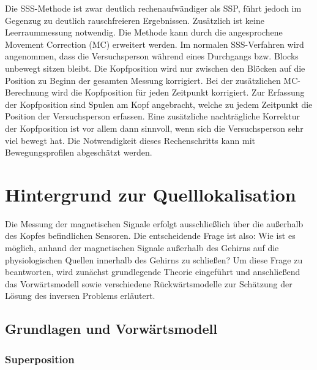\documentclass[doc,a4paper,12pt]{apa6}
\begin{document}
Die SSS-Methode ist zwar deutlich rechenaufwändiger als SSP, führt jedoch im Gegenzug zu deutlich rauschfreieren Ergebnissen. Zusätzlich ist keine Leerraummessung notwendig. Die Methode kann durch die angesprochene Movement Correction (MC) erweitert werden. Im normalen SSS-Verfahren wird angenommen, dass die Versuchsperson während eines Durchgangs bzw. Blocks unbewegt sitzen bleibt. Die Kopfposition wird nur zwischen den Blöcken auf die Position zu Beginn der gesamten Messung korrigiert. Bei der zusätzlichen MC-Berechnung wird die Kopfposition für jeden Zeitpunkt korrigiert. Zur Erfassung der Kopfposition sind Spulen am Kopf angebracht, welche zu jedem Zeitpunkt die Position der Versuchsperson erfassen. Eine zusätzliche nachträgliche Korrektur der Kopfposition ist vor allem dann sinnvoll, wenn sich die Versuchsperson sehr viel bewegt hat. Die Notwendigkeit dieses Rechenschritts kann mit Bewegungsprofilen abgeschätzt werden.


\section{Hintergrund zur Quelllokalisation}
\label{sec:hinter}

Die Messung der magnetischen Signale erfolgt ausschließlich über die außerhalb des Kopfes befindlichen Sensoren. Die entscheidende Frage ist also: Wie ist es möglich, anhand der magnetischen Signale außerhalb des Gehirns auf die physiologischen Quellen innerhalb des Gehirns zu schließen? Um diese Frage zu beantworten, wird zunächst grundlegende Theorie eingeführt und anschließend das Vorwärtsmodell sowie verschiedene Rückwärtsmodelle zur Schätzung der Lösung des inversen Problems erläutert.


\subsection{Grundlagen und Vorwärtsmodell}

\subsubsection{Superposition}
\end{document}
